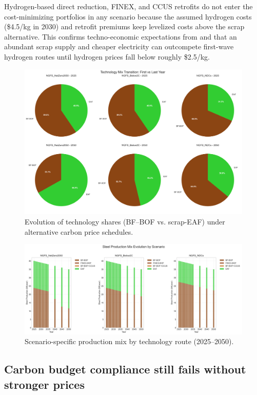 \documentclass[preprint,1p,authoryear]{elsarticle}
\begin{document}
Hydrogen-based direct reduction, FINEX, and CCUS retrofits do not enter the cost-minimizing portfolios in any scenario because the assumed hydrogen costs (\$4.5/kg in 2030) and retrofit premiums keep levelized costs above the scrap alternative. This confirms techno-economic expectations from \citet{MaterialEconomics2019} and \citet{demailly2018european} that an abundant scrap supply and cheaper electricity can outcompete first-wave hydrogen routes until hydrogen prices fall below roughly \$2.5/kg.

\begin{figure}[!t]
  \centering
  \includegraphics[width=0.8\linewidth]{technology_transition}
  \caption{Evolution of technology shares (BF--BOF vs. scrap-EAF) under alternative carbon price schedules.}
  \label{fig:technology-transition}
\end{figure}

\begin{figure}[!t]
  \centering
  \includegraphics[width=0.8\linewidth]{production_mix_evolution}
  \caption{Scenario-specific production mix by technology route (2025--2050).}
  \label{fig:production-mix}
\end{figure}

\subsection{Carbon budget compliance still fails without stronger prices}
\end{document}
